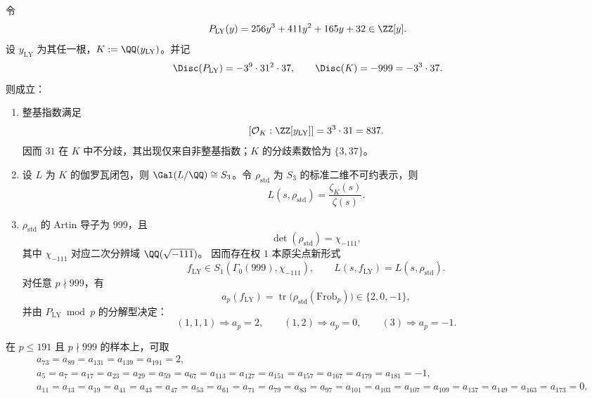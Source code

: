 \begin{theorem}\label{thm:xi-time-part9c-leyang-cubic-artin-weight1}
令
\[
P_{\mathrm{LY}}(y)=256y^3+411y^2+165y+32\in\ZZ[y].
\]
设 \(y_{\mathrm{LY}}\) 为其任一根，\(K:=\QQ(y_{\mathrm{LY}})\)。并记
\[
\Disc(P_{\mathrm{LY}})=-3^9\cdot 31^2\cdot 37,\qquad
\Disc(K)=-999=-3^3\cdot 37.
\]
则成立：
\begin{enumerate}
  \item 整基指数满足
  \[
  [\mathcal O_K:\ZZ[y_{\mathrm{LY}}]]=3^3\cdot 31=837.
  \]
  因而 \(31\) 在 \(K\) 中不分歧，其出现仅来自非整基指数；\(K\) 的分歧素数恰为 \(\{3,37\}\)。
  \item 设 \(L\) 为 \(K\) 的伽罗瓦闭包，则 \(\Gal(L/\QQ)\cong S_3\)。令 \(\rho_{\mathrm{std}}\) 为 \(S_3\) 的标准二维不可约表示，则
  \[
  L(s,\rho_{\mathrm{std}})=\frac{\zeta_K(s)}{\zeta(s)}.
  \]
  \item \(\rho_{\mathrm{std}}\) 的 Artin 导子为 \(999\)，且
  \[
  \det(\rho_{\mathrm{std}})=\chi_{-111},
  \]
  其中 \(\chi_{-111}\) 对应二次分辨域 \(\QQ(\sqrt{-111})\)。
  因而存在权 \(1\) 本原尖点新形式
  \[
  f_{\mathrm{LY}}\in S_1(\Gamma_0(999),\chi_{-111}),
  \qquad
  L(s,f_{\mathrm{LY}})=L(s,\rho_{\mathrm{std}}).
  \]
  对任意 \(p\nmid 999\)，有
  \[
  a_p(f_{\mathrm{LY}})=\operatorname{tr}\bigl(\rho_{\mathrm{std}}(\mathrm{Frob}_p)\bigr)\in\{2,0,-1\},
  \]
  并由 \(P_{\mathrm{LY}}\bmod p\) 的分解型决定：
  \[
  (1,1,1)\Rightarrow a_p=2,\qquad
  (1,2)\Rightarrow a_p=0,\qquad
  (3)\Rightarrow a_p=-1.
  \]
\end{enumerate}
在 \(p\le 191\) 且 \(p\nmid 999\) 的样本上，可取
\begin{align*}
&a_{73}=a_{89}=a_{131}=a_{139}=a_{191}=2,\\
&a_{5}=a_{7}=a_{17}=a_{23}=a_{29}=a_{59}=a_{67}=a_{113}=a_{127}=a_{151}=a_{157}=a_{167}=a_{179}=a_{181}=-1,\\
&a_{11}=a_{13}=a_{19}=a_{41}=a_{43}=a_{47}=a_{53}=a_{61}=a_{71}=a_{79}=a_{83}=a_{97}=a_{101}=a_{103}=a_{107}=a_{109}=a_{137}=a_{149}=a_{163}=a_{173}=0.
\end{align*}
\end{theorem}
